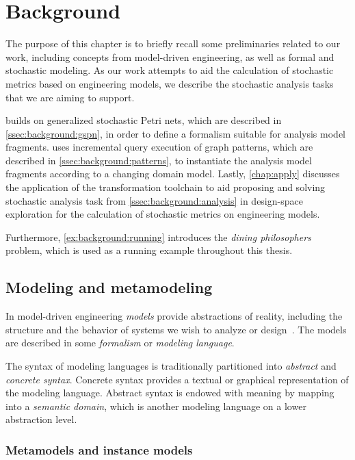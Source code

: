 \chapter{Background}
\label{chap:background}

The purpose of this chapter is to briefly recall some preliminaries related to our work, including concepts from model-driven engineering, as well as formal and stochastic modeling. As our work attempts to aid the calculation of stochastic metrics based on engineering models, we describe the stochastic analysis tasks that we are aiming to support.

 builds on generalized stochastic Petri nets, which are described in \vref{ssec:background:gspn}, in order to define a formalism suitable for analysis model fragments.  uses incremental query execution of graph patterns, which are described in \vref{ssec:background:patterns}, to instantiate the analysis model fragments according to a changing domain model. Lastly, \cref{chap:apply} discusses the application of the transformation toolchain to aid proposing and solving stochastic analysis task from \vref{ssec:background:analysis} in design-space exploration for the calculation of stochastic metrics on engineering models.

Furthermore, \vref{ex:background:running} introduces the \emph{dining philosophers} problem, which is used as a running example throughout this thesis.

\section{Modeling and metamodeling}

In model-driven engineering \emph{models} provide abstractions of reality, including the structure and the behavior of systems we wish to analyze or design~\citep{Giese06multiparadigm}. The models are described in some \emph{formalism} or \emph{modeling language}.

The syntax of modeling languages is traditionally partitioned into \emph{abstract} and \emph{concrete syntax}. Concrete syntax provides a textual or graphical representation of the modeling language. Abstract syntax is endowed with meaning by mapping into a \emph{semantic domain}, which is another modeling language on a lower abstraction level.

\subsection{Metamodels and instance models}

